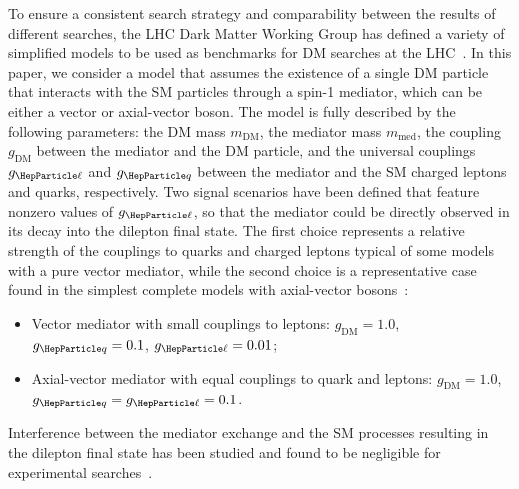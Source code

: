 \documentclass[11pt,twoside,a4paper,cmspaper,final,collab]{cms-tdr}
\begin{document}
To ensure a consistent search strategy and comparability between the results of different searches,  the LHC Dark Matter Working Group has defined a variety of simplified models to be used as benchmarks for DM searches at the LHC~\cite{Albert:2017onk,Backovic:2015soa}. In this paper, we consider a model that assumes the existence of a single DM particle that interacts with the SM particles through a spin-1 mediator, which can be either a vector or axial-vector boson.  The model is fully described by the following parameters: the DM mass $m_\text{DM}$, the mediator mass $m_\text{med}$, the coupling $g_\text{DM}$ between the mediator and the DM particle, and the universal couplings $g_{\Pell}$ and $g_{\PQq}$ between the mediator and the SM charged leptons and quarks, respectively. Two signal scenarios have been defined that feature nonzero values of $g_{\Pell}$, so that the mediator could be directly observed in its decay into the dilepton final state. The first choice represents a relative strength of the couplings to quarks and charged leptons typical of some models with a pure vector mediator, while the second choice is a representative case found in the simplest complete models with axial-vector \PZpr bosons~\cite{Albert:2017onk}:
\begin{itemize}
\item   Vector mediator with small couplings to leptons: $g_\text{DM}=1.0$, $g_{\PQq}=0.1$, $g_{\Pell}=0.01$;
\item   Axial-vector mediator with equal couplings to quark and leptons:  $g_\text{DM}=1.0$,\\ $g_{\PQq}=g_{\Pell}=0.1$.
\end{itemize}
Interference between the mediator exchange and the SM processes resulting in the dilepton final state has been studied and found to be negligible for experimental searches~\cite{Albert:2017onk}.
\end{document}
